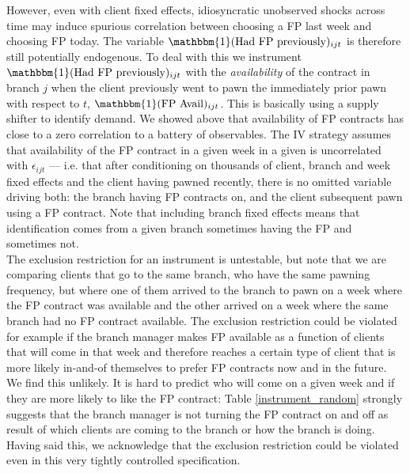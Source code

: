\documentclass[oneside,11pt]{article}
\begin{document}
However, even with client fixed effects, idiosyncratic unobserved shocks across time may induce spurious correlation between choosing a FP last week and choosing FP today. The variable $\mathbbm{1}(\text{Had FP previously})_{ijt}$ is therefore still potentially endogenous. To deal with this we instrument $\mathbbm{1}(\text{Had FP previously})_{ijt}$ with the \textit{availability} of the contract in branch $j$  when the client previously went to pawn the immediately prior pawn with respect to $t$, $\mathbbm{1}(\text{FP Avail})_{ijt}$. This is basically using a supply shifter to identify demand. We showed above that availability of FP contracts has close to a zero correlation to a battery of observables. The IV strategy assumes that availability of the FP contract in a given week in a given is uncorrelated with $\epsilon_{ijt}$ --- i.e. that after conditioning on thousands of client, branch and week fixed effects and the client having pawned recently, there is no omitted variable driving both: the branch having FP contracts on, and the client subsequent pawn using a FP contract. Note that including branch fixed effects means that identification comes from a given branch sometimes having the FP and sometimes not. \\

The exclusion restriction for an instrument is untestable, but note that we are comparing clients that go to the same branch, who have the same pawning frequency, but where one of them arrived to the branch to pawn on a week where the FP contract was available and the other arrived on a week where the same branch had no FP contract available.%
The exclusion restriction could be violated for example if the branch manager makes FP available as a function of clients that will come in that week and therefore reaches a certain type of client that is more likely in-and-of themselves to prefer FP contracts now and in the future. We find this unlikely. It is hard to predict who will come on a given week and if they are more likely to like the FP contract: Table \ref{instrument_random} strongly suggests that the branch manager is not turning the FP contract on and off as result of which clients are coming to the branch or how the branch is doing. Having said this, we acknowledge that the exclusion restriction could be violated even in this very tightly controlled specification.\\
\end{document}
